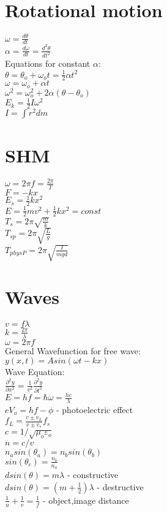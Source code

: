 \begin{multicols}{2}
        \chapter{Rotational motion}
        $\omega=\frac{d\theta}{dt}$\\
        $\alpha=\frac{d\omega}{dt}=\frac{d^2\theta}{dt^2}$\\
        Equations for constant $\alpha$:\\
        $\theta=\theta_o+\omega_ot=\frac{1}{2}\alpha t^2$\\
        $\omega=\omega_o+\alpha t$\\
        $\omega^2=\omega_o^2+2\alpha(\theta-\theta_o)$\\
        $E_k=\frac{1}{2}I\omega^2$\\
        $I=\int r^2 dm$\\

        \chapter{SHM}
        $\omega=2\pi f=\frac{2\pi}{T}$\\
        $F=-kx$\\
        $E_s=\frac{1}{2}kx^2$\\
        $E=\frac{1}{2}mv^2+\frac{1}{2}kx^2=const$\\
        $T_s=2\pi \sqrt{\frac{m}{k}}$\\
        $T_{sp}=2\pi \sqrt{\frac{L}{g}}$\\
        $T_{physP}=2\pi \sqrt{\frac{I}{mgd}}$\\
    
        \chapter{Waves}
        $v=f\lambda$\\
        $k=\frac{2\pi}{\lambda}$\\
        $\omega=2\pi f$\\
        General Wavefunction for free wave:\\
        $y(x,t)=Asin(\omega t-kx)$\\
        Wave Equation:\\
        $\frac{\partial^2y}{\partial x^2}=\frac{1}{v^2}\frac{\partial^2y}{\partial t^2}$\\
        $E=hf=\hbar\omega=\frac{hc}{\lambda}$\\
        $eV_o=hf-\phi$ - photoelectric effect\\
        $f_L=\frac{v\pm v_L}{v \pm v_s}f_s$\\
        $c=1/\sqrt{\mu_o \varepsilon_o}$\\
        $n=c/v$\\
        $n_asin(\theta_a)=n_bsin(\theta_b)$\\
        $sin(\theta_c)=\frac{n_b}{n_a}$\\
        $dsin(\theta)=m\lambda$ - constructive\\
        $dsin(\theta)=(m+\frac{1}{2})\lambda$ - destructive\\
        $\frac{1}{u}+\frac{1}{v}=\frac{1}{f}$ - object,image distance\\


\end{multicols}
